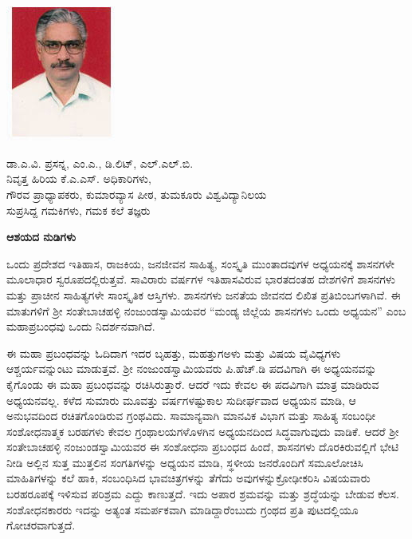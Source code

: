 
\chapter{}

\includegraphics[scale=3]{images/prasanna.jpeg}

\noindent
ಡಾ.ಎ.ವಿ. ಪ್ರಸನ್ನ, ಎಂ.ಎ., ಡಿ.ಲಿಟ್​, ಎಲ್​.ಎಲ್​.ಬಿ. \\ ನಿವೃತ್ತ ಹಿರಿಯ ಕೆ.ಎ.ಎಸ್​. ಅಧಿಕಾರಿಗಳು, \\ ಗೌರವ ಪ್ರಾಧ್ಯಾಪಕರು, ಕುಮಾರವ್ಯಾಸ ಪೀಠ, ತುಮಕೂರು ವಿಶ್ವವಿದ್ಯಾನಿಲಯ \\ ಸುಪ್ರಸಿದ್ದ ಗಮಕಿಗಳು, ಗಮಕ ಕಲೆ ತಜ್ಞರು

\begin{center}
\textbf{ಆಶಯದ ನುಡಿಗಳು}
\end{center}

ಒಂದು ಪ್ರದೇಶದ ಇತಿಹಾಸ, ರಾಜಕಿಯ, ಜನಜೀವನ ಸಾಹಿತ್ಯ, ಸಂಸ್ಕೃತಿ ಮುಂತಾದವುಗಳ ಅಧ್ಯಯನಕ್ಕೆ ಶಾಸನಗಳೇ ಮೂಲಾಧಾರ ಸ್ವರೂಪದಲ್ಲಿರುತ್ತವೆ. ಸಾವಿರಾರು ವರ್ಷಗಳ ಇತಿಹಾಸವಿರುವ ಭಾರತದಂತಹ ದೇಶಗಳಿಗೆ ಶಾಸನಗಳು ಮತ್ತು ಪ್ರಾಚೀನ ಸಾಹಿತ್ಯಗಳೇ ಸಾಂಸ್ಕೃತಿಕ ಆಸ್ತಿಗಳು. ಶಾಸನಗಳು ಜನತೆಯ ಜೀವನದ ಲಿಖಿತ ಪ್ರತಿಬಿಂಬ\-ಗಳಾಗಿವೆ. ಈ ಮಾತುಗಳಿಗೆ ಶ‍್ರೀ ಸಂತೇಬಾಚಹಳ್ಳಿ ನಂಜುಂಡಸ್ವಾಮಿಯವರ “ಮಂಡ್ಯ ಜಿಲ್ಲೆಯ ಶಾಸನಗಳು ಒಂದು ಅಧ್ಯಯನ” ಎಂಬ ಮಹಾಪ್ರಬಂಧವು ಒಂದು ನಿದರ್ಶನವಾಗಿದೆ.

ಈ ಮಹಾ ಪ್ರಬಂಧವನ್ನು ಓದಿದಾಗ ಇದರ ಬೃಹತ್ತು, ಮಹತ್ತುಗಅಳು ಮತ್ತು ವಿಷಯ ವೈವಿಧ್ಯಗಳು ಆಶ್ಚರ್ಯವನ್ನುಂಟು ಮಾಡುತ್ತವೆ. ಶ‍್ರೀ ನಂಜುಂಡಸ್ವಾಮಿಯವರು ಪಿ.ಹೆಚ್​.ಡಿ ಪದವಿಗಾಗಿ ಈ ಅಧ್ಯಯನವನ್ನು ಕೈಗೊಂಡು ಈ ಮಹಾ ಪ್ರಬಂಧವನ್ನು ರಚಿಸಿರುತ್ತಾರೆ. ಆದರೆ ಇದು ಕೇವಲ ಈ ಪದವಿಗಾಗಿ ಮಾತ್ರ ಮಾಡಿರುವ ಅಧ್ಯಯನವಲ್ಲ. ಕಳೆದ ಸುಮಾರು ಮೂವತ್ತು ವರ್ಷಗಳಷ್ಟುಕಾಲ ಸುದೀರ್ಘವಾದ ಅಧ್ಯಯನ ಮಾಡಿ, ಆ ಅನುಭವದಿಂದ ರಚಿತಗೊಂಡಿರುವ ಗ್ರಂಥವಿದು. ಸಾಮಾನ್ಯವಾಗಿ ಮಾನವಿಕ ವಿಭಾಗ ಮತ್ತು ಸಾಹಿತ್ಯ ಸಂಬಂಧೀ ಸಂಶೋಧನಾತ್ಮಕ ಬರಹಗಳು ಕೇವಲ ಗ್ರಂಥಾಲಯ\-ಗಳೊಳಗಿನ ಅಧ್ಯಯನದಿಂದ ಸಿದ್ಧವಾಗುವುದು ವಾಡಿಕೆ. ಆದರೆ ಶ‍್ರೀ ಸಂತೇಬಾಚಹಳ್ಳಿ ನಂಜುಂಡಸ್ವಾಮಿಯವರ ಈ ಸಂಶೋಧನಾ ಪ್ರಬಂಧದ ಹಿಂದೆ, ಶಾಸನಗಳು ದೊರಕಿರುವಲ್ಲಿಗೆ ಭೇಟಿ ನೀಡಿ ಅಲ್ಲಿನ ಸುತ್ತ ಮುತ್ತಲಿನ ಸಂಗತಿಗಳನ್ನು ಅಧ್ಯಯನ ಮಾಡಿ, ಸ್ಥಳೀಯ ಜನರೊಂದಿಗೆ ಸಮೂಲೋಚಿಸಿ ಮಾಹಿತಿಗಳನ್ನು ಕಲೆ ಹಾಕಿ, ಸಂಬಂಧಿಸಿದ ಭಾವಚಿತ್ರಗಳನ್ನು ತೆಗೆದು ಅವುಗಳನ್ನು\break ಕ್ರೋಢೀಕರಿಸಿ ವಿಷಯವಾರು ಬರಹರೂಪಕ್ಕೆ ಇಳಿಸುವ ಪರಿಶ್ರಮ ಎದ್ದು ಕಾಣುತ್ತದೆ. ಇದು ಅಪಾರ ಶ್ರಮವನ್ನು ಮತ್ತು ಶ್ರದ್ಧೆಯನ್ನು ಬೇಡುವ ಕೆಲಸ. ಸಂಶೋಧನಕಾರರು ಇದನ್ನು ಅತ್ಯಂತ ಸಮರ್ಪಕವಾಗಿ ಮಾಡಿದ್ದಾರೆಂಬುದು ಗ್ರಂಥದ ಪ್ರತಿ ಪುಟದಲ್ಲಿಯೂ ಗೋಚರವಾಗುತ್ತದೆ.


